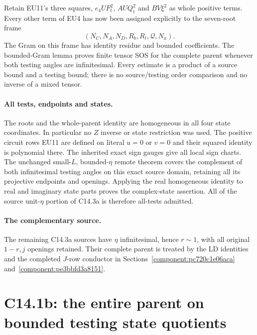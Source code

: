 Retain EU11's three squares, $e_4UF_t^2$, $AUQ_t^2$ and
$BV\xi^2$ as whole positive terms. Every other term of EU4 has now
been assigned explicitly to the seven-root frame
\[
                 (N_C,N_A,N_D,R_b,R_t,\mathcal Q,N_x).             \tag{EU12}
\]
The Gram on this frame has identity residue and bounded coefficients.
The bounded-Gram lemma proves finite tensor SOS for the complete
parent whenever both testing angles are infinitesimal. Every estimate
is a product of a source bound and a testing bound; there is no
source/testing order comparison and no inverse of a mixed tensor.

\paragraph{All tests, endpoints and states.}
The roots and the whole-parent identity are homogeneous in all four
state coordinates. In particular no $Z$ inverse or state restriction
was used. The positive circuit rows EU11 are defined on literal
$u=0$ or $v=0$ and their squared identity is polynomial there.
The inherited exact sign gauges give all local sign charts.
The unchanged small-$L$, bounded-$\eta$ remote theorem covers the
complement of both infinitesimal testing angles on this exact source
domain, retaining all its projective endpoints and openings.
Applying the real homogeneous identity to real and imaginary state
parts proves the complex-state assertion. All of the source unit-$\eta$
portion of C14.3a is therefore all-tests admitted.

\paragraph{The complementary source.}
The remaining C14.3a sources have $\eta$ infinitesimal, hence $r\sim1$, with all original $1-r,j$ openings retained. Their complete parent is treated by the LD identities and the completed $J$-row conductor in Sections~\ref{component:pc720c1e06aca} and~\ref{component:pe3bbfd3a8151}.


\section{\texorpdfstring{C14.1b: the entire parent on bounded testing state quotients}{C14.1b: the entire parent on bounded testing state quotients}}
\label{component:pff0a29ebf284}

\label{pff0a29ebf284:sec:r17-c1-bounded-state}


